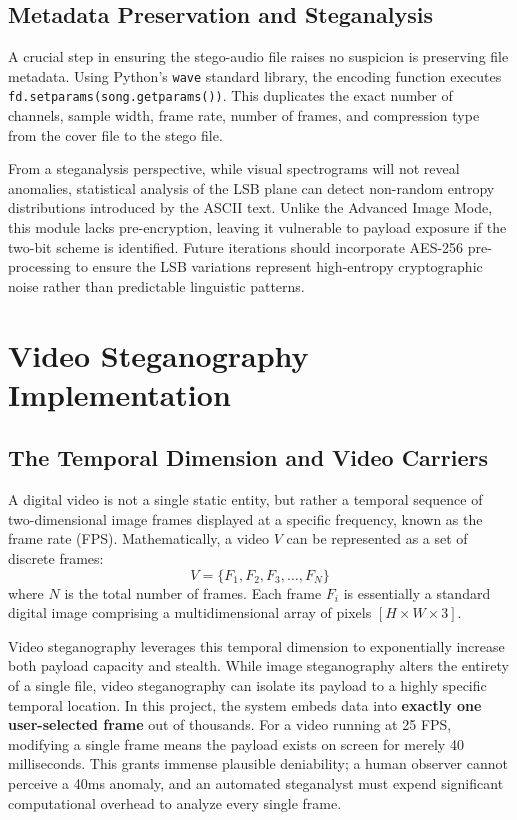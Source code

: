 \documentclass[12pt,a4paper]{report}
\begin{document}
\section{Metadata Preservation and Steganalysis}
A crucial step in ensuring the stego-audio file raises no suspicion is preserving file metadata. Using Python's \texttt{wave} standard library, the encoding function executes \texttt{fd.setparams(song.getparams())}. This duplicates the exact number of channels, sample width, frame rate, number of frames, and compression type from the cover file to the stego file. 

From a steganalysis perspective, while visual spectrograms will not reveal anomalies, statistical analysis of the LSB plane can detect non-random entropy distributions introduced by the ASCII text. Unlike the Advanced Image Mode, this module lacks pre-encryption, leaving it vulnerable to payload exposure if the two-bit scheme is identified. Future iterations should incorporate AES-256 pre-processing to ensure the LSB variations represent high-entropy cryptographic noise rather than predictable linguistic patterns.
\chapter{Video Steganography Implementation}

\section{The Temporal Dimension and Video Carriers}
A digital video is not a single static entity, but rather a temporal sequence of two-dimensional image frames displayed at a specific frequency, known as the frame rate (FPS). Mathematically, a video $V$ can be represented as a set of discrete frames:
$$V = \{F_1, F_2, F_3, \dots, F_N\}$$
where $N$ is the total number of frames. Each frame $F_i$ is essentially a standard digital image comprising a multidimensional array of pixels $[H \times W \times 3]$. 

Video steganography leverages this temporal dimension to exponentially increase both payload capacity and stealth. While image steganography alters the entirety of a single file, video steganography can isolate its payload to a highly specific temporal location. In this project, the system embeds data into \textbf{exactly one user-selected frame} out of thousands. For a video running at 25 FPS, modifying a single frame means the payload exists on screen for merely 40 milliseconds. This grants immense plausible deniability; a human observer cannot perceive a 40ms anomaly, and an automated steganalyst must expend significant computational overhead to analyze every single frame.
\end{document}

